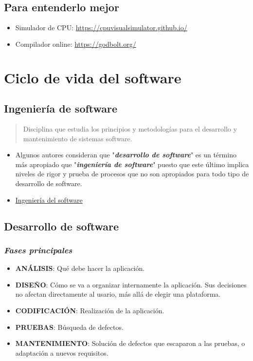 \documentclass[a4paper]{article}
\begin{document}
\subsection{Para entenderlo mejor}
\label{sec:org0000009}

\begin{itemize}
\item Simulador de CPU: \url{https://cpuvisualsimulator.github.io/}
\item Compilador online: \href{https://godbolt.org/}{https://godbolt.org/}
\end{itemize}
\section{Ciclo de vida del software}
\label{ciclo-de-vida-del-software}
\subsection{Ingeniería de software}
\label{ingeniería-de-software}
\begin{quote}
Disciplina que estudia los principios y metodologías para el desarrollo y mantenimiento de sistemas software.
\end{quote}

\begin{itemize}
\item Algunos autores consideran que "\textbf{\emph{desarrollo de software}}" es un término más apropiado que "\textbf{\emph{ingeniería de software}}" puesto que este último implica niveles de rigor y prueba de procesos que no son apropiados para todo tipo de desarrollo de software.
\item \href{https://es.wikipedia.org/wiki/Ingenier\%C3\%ADa\_de\_software}{Ingeniería del software}
\end{itemize}
\subsection{Desarrollo de software}
\label{desarrollo-de-software}
\subsubsection{\textbf{\emph{Fases principales}}}
\label{fases-principales}
\begin{itemize}
\item \textbf{ANÁLISIS}: Qué debe hacer la aplicación.
\item \textbf{DISEÑO}: Cómo se va a organizar internamente la aplicación. Sus decisiones no afectan directamente al usario, más allá de elegir una plataforma.
\item \textbf{CODIFICACIÓN}: Realización de la aplicación.
\item \textbf{PRUEBAS}: Búsqueda de defectos.
\item \textbf{MANTENIMIENTO}: Solución de defectos que escaparon a las pruebas, o adaptación a nuevos requisitos.
\end{itemize}
\end{document}
